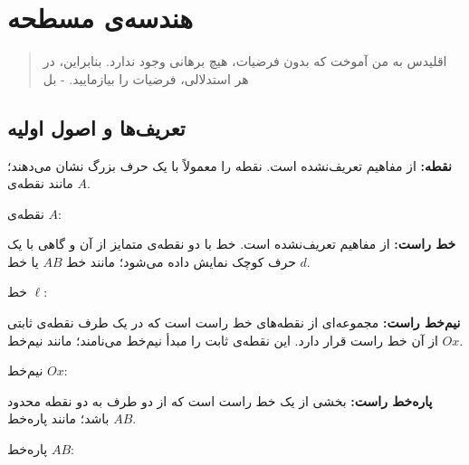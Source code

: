 \chapter{هندسه‌ی مسطحه}
\thispagestyle{empty}

\begin{quote}
	{\lotus
		اقلیدس به من آموخت که بدون فرضیات، هیچ برهانی وجود ندارد. بنابراین، در هر استدلالی، فرضیات را بیازمایید. \quad - بل%
	}
\end{quote}

\section{تعریف‌ها و اصول اولیه}
\textbf{نقطه:}
از مفاهیم تعریف‌نشده است. نقطه را معمولاً با یک حرف بزرگ نشان می‌دهند؛ مانند نقطه‌ی $A$.
\begin{example}
	نقطه‌ی $A$:
	\begin{center}
	\end{center}
\end{example}
\smallskip
\textbf{خط راست:}
از مفاهیم تعریف‌نشده است. خط با دو نقطه‌ی متمایز از آن و گاهی با یک حرف کوچک نمایش داده می‌شود؛ مانند خط $AB$ یا خط $d$.
\begin{example}
	خط
	$\ell$:
	\begin{center}
	\end{center}
\end{example}
\smallskip
\textbf{نیم‌خط راست:}
مجموعه‌ای از نقطه‌های خط راست است که در یک طرف نقطه‌ی ثابتی از آن خط راست قرار دارد. این نقطه‌ی ثابت را مبدأ نیم‌خط می‌نامند؛ مانند نیم‌خط $Ox$.
\begin{example}
	نیم‌خط $Ox$:
	\begin{center}
	\end{center}
\end{example}
\smallskip
\textbf{پاره‌خط راست:}
بخشی از یک خط راست است که از دو طرف به دو نقطه محدود باشد؛ مانند پاره‌خط $AB$.
\begin{example}
	پاره‌خط $AB$:
	\begin{center}
	\end{center}
\end{example}
